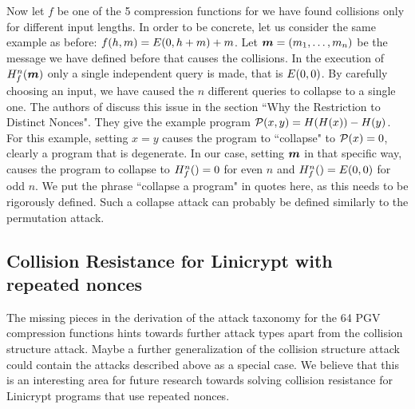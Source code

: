 Now let $f$ be one of the 5 compression functions for we have found collisions only for different input lengths.  
In order to be concrete, let us consider the same example as before: $f(h,m) = \E(0, h+m) +m$.
Let $\vm = (\dts m n)$ be the message we have defined before that causes the collisions.
In the execution of $\H^n_f(\vm)$ only a single independent query is made, that is $\E(0,0)$.
By carefully choosing an input, we have caused the $n$ different queries to collapse to a single one.
The authors of \cite{TCC:McQSwoRos19} discuss this issue in the section ``Why the Restriction to Distinct Nonces".
They give the example program $\P(x,y) = \H(\H(x)) - \H(y)$.
For this example, setting $x=y$ causes the program to ``collapse" to $\P(x) = 0$,
clearly a program that is degenerate.
In our case, setting $\vm$ in that specific way,
causes the program to collapse to $\H^n_f() = 0$ for even $n$ and $\H^n_f() = E(0,0)$ for odd $n$.
We put the phrase ``collapse a program" in quotes here, as this needs to be rigorously defined.
Such a collapse attack can probably be defined similarly to the permutation attack.

\subsection{Collision Resistance for Linicrypt with repeated nonces}
The missing pieces in the derivation of the attack taxonomy for the 64 PGV compression functions
hints towards further attack types apart from the collision structure attack.
Maybe a further generalization of the collision structure attack could contain the attacks described above as a special case.
We believe that this is an interesting area for future research
towards solving collision resistance for Linicrypt programs that use repeated nonces.

